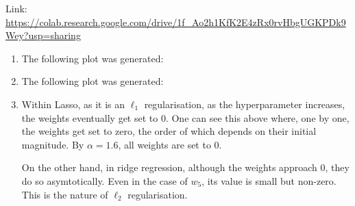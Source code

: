 \medskip
\lstset{
  basicstyle=\small\ttfamily,
  breaklines=true,
  columns=fullflexible
}

\begin{solution}
  Link: \url{https://colab.research.google.com/drive/1f_Ao2h1KfK2E4zRx0rvHbgUGKPDk9Wey?usp=sharing}
  \begin{enumerate}
    \item The following plot was generated:
    \begin{figure}[H]
    \end{figure}
    \item The following plot was generated:
    \begin{figure}[H]
    \end{figure}
    \item Within Lasso, as it is an $\ell_1$ regularisation, as the hyperparameter increases, the weights eventually get set to 0. One can see this above where, one by one, the weights get set to zero, the order of which depends on their initial magnitude. By $\alpha=1.6$, all weights are set to 0. 
    
    On the other hand, in ridge regression, although the weights approach 0, they do so asymtotically. Even in the case of $w_5$, its value is small but non-zero. This is the nature of $\ell_2$ regularisation.
  \end{enumerate}
\end{solution}

\problem[9]

